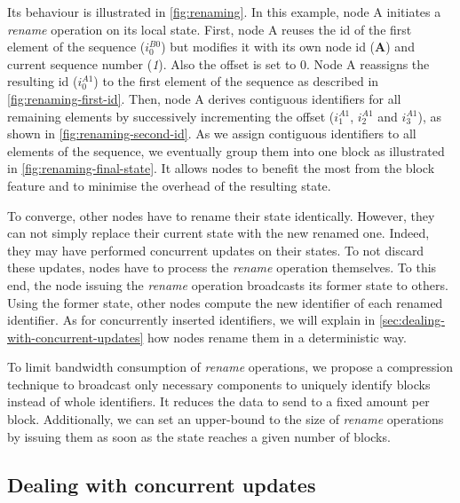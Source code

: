 \documentclass[10pt,journal,compsoc]{IEEEtran}
\newcommand{\trm}[1]{\mathit{#1}}
\newcommand{\id}[3]{$\trm{#1}^{\trm{#2}}_{\trm{#3}}$}
\begin{document}
Its behaviour is illustrated in \autoref{fig:renaming}.
In this example, node A initiates a \emph{rename} operation on its local state.
First, node A reuses the id of the first element of the sequence (\id{i}{B0}{0}) but modifies it with its own node id (\textbf{A}) and current sequence number (\emph{1}).
Also the offset is set to 0.
Node A reassigns the resulting id (\id{i}{A1}{0}) to the first element of the sequence as described in \autoref{fig:renaming-first-id}.
Then, node A derives contiguous identifiers for all remaining elements by successively incrementing the offset (\id{i}{A1}{1}, \id{i}{A1}{2} and \id{i}{A1}{3}), as shown in \autoref{fig:renaming-second-id}.
As we assign contiguous identifiers to all elements of the sequence, we eventually group them into one block as illustrated in \autoref{fig:renaming-final-state}.
It allows nodes to benefit the most from the block feature and to minimise the overhead of the resulting state.

To converge, other nodes have to rename their state identically.
However, they can not simply replace their current state with the new renamed one.
Indeed, they may have performed concurrent updates on their states.
To not discard these updates, nodes have to process the \emph{rename} operation themselves.
To this end, the node issuing the \emph{rename} operation broadcasts its former state to others.
Using the former state, other nodes compute the new identifier of each renamed identifier.
As for concurrently inserted identifiers, we will explain in \autoref{sec:dealing-with-concurrent-updates} how nodes rename them in a deterministic way.

To limit bandwidth consumption of \emph{rename} operations, we propose a compression technique to broadcast only necessary components to uniquely identify blocks instead of whole identifiers.
It reduces the data to send to a fixed amount per block.
Additionally, we can set an upper-bound to the size of \emph{rename} operations by issuing them as soon as the state reaches a given number of blocks.

\subsection{Dealing with concurrent updates}
\end{document}
